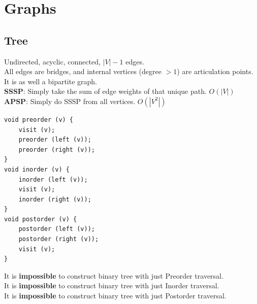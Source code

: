 \documentclass[8pt, a4paper, oneside, twocolumn]{extarticle}
\begin{document}
\section{Graphs}
\subsection{Tree}
Undirected, acyclic, connected, $|V| - 1$ edges.\\
All edges are bridges, and internal vertices (degree $> 1$) are articulation points.\\
It is as well a bipartite graph.\\
\textbf{SSSP}: Simply take the sum of edge weights of that unique path. $O(|V|)$\\
\textbf{APSP}: Simply do SSSP from all vertices. $O(|V^2|)$
\begin{verbatim}
void preorder (v) {
	visit (v);
	preorder (left (v));
	preorder (right (v));
}
void inorder (v) {
	inorder (left (v));
	visit (v);
	inorder (right (v));
}
void postorder (v) {
	postorder (left (v));
	postorder (right (v));
	visit (v);
}
\end{verbatim}
It is \textbf {impossible} to construct binary tree with just Preorder traversal.\\ 
It is \textbf {impossible} to construct binary tree with just Inorder traversal.\\
It is \textbf {impossible} to construct binary tree with just Postorder traversal.
\end{document}
